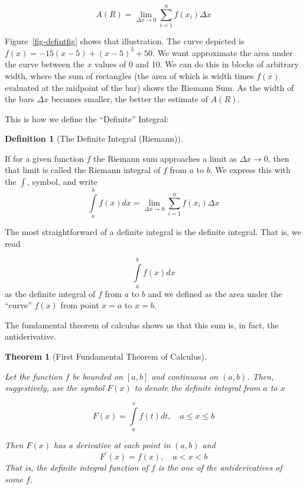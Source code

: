 \documentclass[
  letterpaper,
]{book}
\theoremstyle{definition}
\newtheorem{definition}{Definition}[chapter]
\theoremstyle{definition}
\theoremstyle{plain}
\theoremstyle{definition}
\theoremstyle{plain}
\newtheorem{theorem}{Theorem}[chapter]
\theoremstyle{plain}
\theoremstyle{remark}
\begin{document}
\[A(R)=\lim\limits_{\Delta x\to 0}\sum\limits_{i=1}^n f(x_i)\Delta x\]

Figure~\ref{fig-defintfig} shows that illustration. The curve depicted
is \(f(x) = -15(x - 5) + (x - 5)^3 + 50.\) We want approximate the area
under the curve between the \(x\) values of 0 and 10. We can do this in
blocks of arbitrary width, where the sum of rectangles (the area of
which is width times \(f(x)\) evaluated at the midpoint of the bar)
shows the Riemann Sum. As the width of the bars \(\Delta x\) becomes
smaller, the better the estimate of \(A(R)\).

This is how we define the ``Definite'' Integral:

\leavevmode{}%
\begin{definition}[The Definite Integral (Riemann)]\label{def-}

If for a given function \(f\) the Riemann sum approaches a limit as
\(\Delta x \to 0\), then that limit is called the Riemann integral of
\(f\) from \(a\) to \(b\). We express this with the \(\int\), symbol,
and write
\[\int\limits_a^b f(x) dx= \lim\limits_{\Delta x\to 0} \sum\limits_{i=1}^n f(x_i)\Delta x\]

The most straightforward of a definite integral is the definite
integral. That is, we read

\[\int\limits_a^b f(x) dx\] as the definite integral of \(f\) from \(a\)
to \(b\) and we defined as the area under the ``curve'' \(f(x)\) from
point \(x=a\) to \(x=b\).

\end{definition}

The fundamental theorem of calculus shows us that this sum is, in fact,
the antiderivative.

\leavevmode{}%
\begin{theorem}[First Fundamental Theorem of Calculus]\label{thm-}

Let the function \(f\) be bounded on \([a,b]\) and continuous on
\((a,b)\). Then, suggestively, use the symbol \(F(x)\) to denote the
definite integral from \(a\) to \(x\)

\[F(x)=\int\limits_a^x f(t)dt, \quad a\le x\le b\]

Then \(F(x)\) has a derivative at each point in \((a,b)\) and
\[F^\prime(x)=f(x), \quad a<x<b\] That is, the definite integral
function of \(f\) \emph{is} the one of the antiderivatives of some
\(f\).

\end{theorem}
\end{document}

